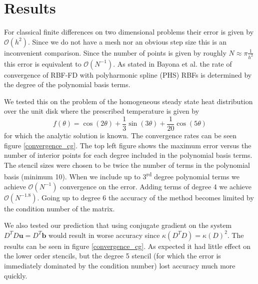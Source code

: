 \documentclass[12pt]{article}
\let\vec\mathbf
\begin{document}
\section{Results} \label{sec_results}

	For classical finite differences on two dimensional problems their error is given by $\mathcal{O}(h^2)$. Since we do not have a mesh nor an obvious step size this is an inconvenient comparison. Since the number of points is given by roughly $N \approx \pi \frac{1}{h^2}$ this error is equivalent to $\mathcal{O}(N^{-1})$. As stated in Bayona et al. \cite{Flyer2017-2} the rate of convergence of RBF-FD with polyharmonic spline (PHS) RBFs is determined by the degree of the polynomial basis terms. 
	
	We tested this on the problem of the homogeneous steady state heat distribution over the unit disk where the prescribed temperature is given by 
	$$f(\theta) = \cos(2\theta) + \frac{1}{3}\sin(3\theta) + \frac{1}{20}\cos(5\theta)$$
	\noindent for which the analytic solution is known. The convergence rates can be seen figure \ref{convergence_cg}. The top left figure shows the maximum error versus the number of interior points for each degree included in the polynomial basis terms. The stencil sizes were chosen to be twice the number of terms in the polynomial basis (minimum 10). When we include up to 3\textsuperscript{rd} degree polynomial terms we achieve $\mathcal{O}(N^{-1})$ convergence on the error. Adding terms of degree 4 we achieve $\mathcal{O}(N^{-1.8})$. Going up to degree 6 the accuracy of the method becomes limited by the condition number of the matrix. 
	
	We also tested our prediction that using conjugate gradient on the system $D^TD \vec{u}=D^T \vec{b}$ would result in worse accuracy since $\kappa(D^TD) = \kappa(D)^2$. The results can be seen in figure \ref{convergence_cg}. As expected it had little effect on the lower order stencils, but the degree 5 stencil (for which the error is immediately dominated by the condition number) lost accuracy much more quickly. 
	
\end{document}
